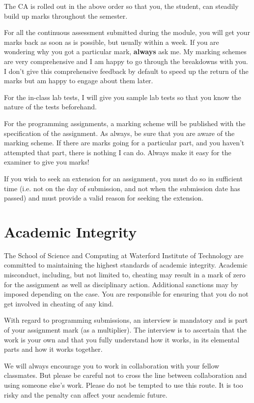 \documentclass{article}
\begin{document}
The CA is rolled out in the above order so that you, the student, can steadily build up marks throughout the semester. 

For all the continuous assessment submitted during the module, you will get your marks back as soon as is possible, but usually within a week. 
If you are wondering why you got a particular mark, \textbf{always} ask me. My marking schemes are very comprehensive and I am happy to go through the breakdowns with you. 
I don't give this comprehensive feedback by default to speed up the return of the marks but am happy to engage about them later. 

For the in-class lab tests, I will give you sample lab tests so that you know the nature of the tests beforehand. 

For the programming assignments, a marking scheme will be published with the specification of the assignment. As always, be sure that you are aware of the marking scheme. 
If there are marks going for a particular part, and you haven't attempted that part, there is nothing I can do. Always make it easy for the examiner to give you marks!

If you wish to seek an extension for an assignment, you must do so in sufficient time (i.e. not on the day of submission, and not 
when the submission date has passed) and must provide a valid reason for seeking the extension. 


\section{Academic Integrity}
The School of Science and Computing  at Waterford Institute of Technology are  committed to maintaining the highest standards of academic integrity. 
Academic misconduct, including, but not limited to, cheating may result in a mark of zero for the assignment as well as disciplinary action.
Additional sanctions may by imposed depending on the case. You are responsible for ensuring that you do not get involved in cheating of any kind. 
 
With regard to programming submissions, an interview is mandatory and is part of your assignment mark (as a multiplier). 
The interview is to ascertain that the work is your own and that you fully understand how it works, in its elemental parts and how it works together. 
 
We  will always encourage you to work in collaboration with your fellow classmates. But please be careful not to cross the line between collaboration and using someone else's work. 
Please do not be tempted to use this route. 
It is too risky and the penalty can affect your academic future. 
\end{document}
